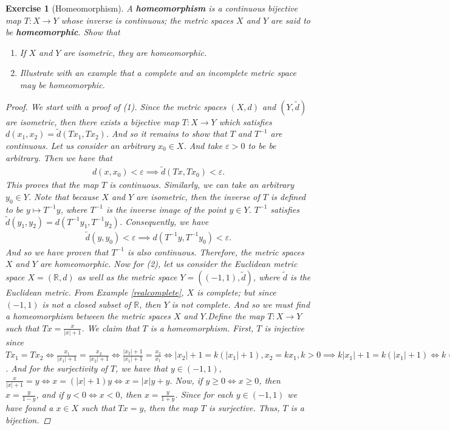 \documentclass[11pt]{article}
\theoremstyle{mystyle}
\newtheorem{protoexer}{Exercise}[section]
\newenvironment{exer}
{\colorlet{shadecolor}{blue!15}\begin{shaded}\begin{protoexer}}
{\end{protoexer}\end{shaded}}
\begin{document}
\begin{exer}[Homeomorphism]
A \textbf{homeomorphism} is a continuous bijective map $T: X \longrightarrow Y$ whose inverse is continuous; the metric spaces $X$ and $Y$ are said to be \textbf{homeomorphic}. Show that 
\begin{enumerate}
    \item If $X$ and $Y$ are isometric, they are homeomorphic.
    \item Illustrate with an example that a complete and an incomplete metric space may be homeomorphic.
\end{enumerate}
\begin{proof}
We start with a proof of (1). Since the metric spaces $(X, d)$ and $(Y, \tilde{d})$ are isometric, then there exists a bijective map $T: X \longrightarrow Y$ which satisfies $d(x_1, x_2) = \tilde{d}(Tx_1, Tx_2)$. And so it remains to show that $T$ and $T^{-1}$ are continuous.\newline
Let us consider an arbitrary $x_0 \in X$. And take $\varepsilon > 0$ to be be arbitrary. Then we have that
\begin{align*}
    d(x, x_0) < \varepsilon \implies \tilde{d}(Tx, Tx_0) < \varepsilon.
\end{align*}
This proves that the map $T$ is continuous. Similarly, we can take an arbitrary $y_0 \in Y$. Note that because $X$ and $Y$ are isometric, then the inverse of $T$ is defined to be $y \mapsto T^{-1}y$, where $T^{-1}$ is the inverse image of the point $y \in Y$. $T^{-1}$ satisfies $\tilde{d}(y_1, y_2) = d(T^{-1}y_1, T^{-1}y_2)$. Consequently, we have
\begin{align*}
    \tilde{d}(y, y_0) < \varepsilon \implies d(T^{-1}y, T^{-1}y_0) < \varepsilon.
\end{align*}
And so we have proven that $T^{-1}$ is also continuous.\newline
Therefore, the metric spaces $X$ and $Y$ are homeomorphic.\newline
Now for (2), let us consider the Euclidean metric space $X = (\mathbb{R}, d)$ as well as the metric space $Y= ((-1, 1), \tilde{d})$, where $\tilde{d}$ is the Euclidean metric. From Example \ref{realcomplete}, $X$ is complete; but since $(-1, 1)$ is not a closed subset of $\mathbb{R}$, then $Y$ is not complete. And so we must find a homeomorphism between the metric spaces $X$ and $Y$.\newline Define the map $T: X \longrightarrow Y$ such that $Tx = \frac{x}{|x| + 1}$. We claim that $T$ is a homeomorphism. First, $T$ is injective since $Tx_1 = Tx_2 \iff \frac{x_1}{|x_1| + 1} = \frac{x_2}{|x_2| + 1} \iff \frac{|x_2| + 1}{|x_1| + 1} = \frac{x_2}{x_1} \iff |x_2| + 1 = k(|x_1| + 1), x_2 = kx_1, k > 0 \implies k|x_1| + 1 = k(|x_1| + 1) \iff k = 1  \implies x_2 = x_1$. And for the surjectivity of $T$, we have that $y \in (-1, 1)$, $\frac{x}{|x|+1} = y \iff x = (|x|+1)y \iff x = |x|y + y$. Now, if $y \geq 0 \iff x \geq 0$, then $x = \frac{y}{1-y}$, and if $y < 0 \iff x < 0$, then $x = \frac{y}{1+y}$. Since for each $y \in (-1, 1)$ we have found a $x \in X$ such that $Tx = y$, then the map $T$ is surjective. Thus, $T$ is a bijection.\newline

\end{proof}
\end{exer}
\end{document}
